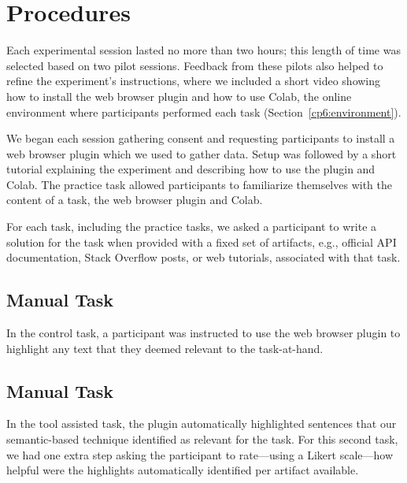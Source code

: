 
\section{Procedures}
\label{cp6:procedures}



Each experimental session lasted no more than two hours; this length of time was selected based on two pilot sessions. 
Feedback from these pilots also helped to refine the experiment's instructions, where we included a short video showing how to install the web browser plugin and how to use Colab, the online environment where participants performed each task (Section~\ref{cp6:environment}).






We began each session gathering consent and requesting participants to install a web browser plugin which we used to gather data.
Setup was followed by a short tutorial explaining the experiment and describing how to use the plugin and Colab. 
The practice task allowed participants to familiarize themselves with the content of a task, the web browser plugin and Colab. 



For each task, including the practice tasks, we asked a participant to write a solution for the task
when provided with a fixed set of artifacts, e.g., official API documentation, Stack Overflow posts, or web tutorials, 
associated with that task.  


\subsection{Manual Task}



In the control task, a participant was instructed to use the web browser plugin to highlight any text that they deemed relevant to the task-at-hand. 

\subsection{Manual Task}

In the tool assisted task, the plugin automatically highlighted sentences that our semantic-based technique identified as relevant for the task. 
For this second task, we had one extra step asking the participant to rate---using a Likert scale---how helpful were the highlights automatically identified per artifact available. 


